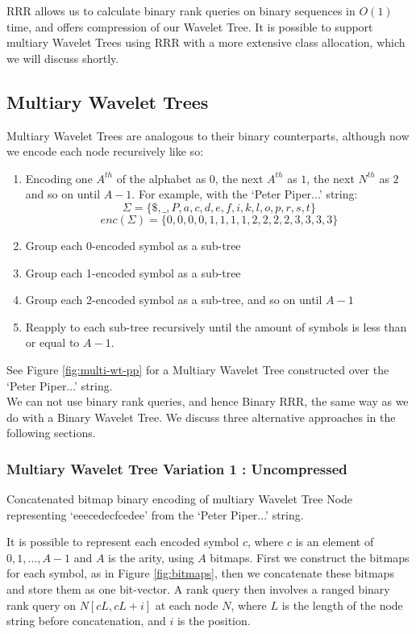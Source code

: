 RRR allows us to calculate binary rank queries on binary sequences in $O(1)$ time, and 
offers compression of our Wavelet Tree. It is possible to support multiary 
Wavelet Trees using RRR with a more extensive class allocation, which we will 
discuss shortly.

\clearpage
\subsection{Multiary Wavelet Trees}
Multiary Wavelet Trees are analogous to their binary counterparts, although now we encode each node recursively like so:

\begin{enumerate}
    \item Encoding one $A^{th}$ of the alphabet as $0$, the next $A^{th}$ as 
		$1$, the next $N^{th}$ as $2$ and so on until $A-1$. For example, with 
		the `Peter Piper...' string:
		$$\Sigma = \{ \$, \_, P, a, c, d, e, f, i, k, l, o, p, r, s, t \}$$
	   	$$enc(\Sigma) = \{  0,  0, 0, 0, 1, 1, 1, 1, 2, 2, 2, 2, 3, 3, 3, 3 \}$$
    \item Group each 0-encoded symbol as a sub-tree
    \item Group each 1-encoded symbol as a sub-tree
    \item Group each 2-encoded symbol as a sub-tree, and so on until $A-1$
    \item Reapply to each sub-tree recursively until the amount of symbols is
	less than or equal to $A - 1$.
\end{enumerate}

See Figure \ref{fig:multi-wt-pp} for a Multiary Wavelet Tree constructed over
the `Peter Piper...' string.\\

We can not use binary rank queries, and hence Binary RRR, the same way as we do 
with a Binary Wavelet Tree. We discuss three alternative approaches in the 
following sections.

\subsubsection{Multiary Wavelet Tree Variation 1 : Uncompressed}
		{Concatenated bitmap binary encoding of multiary Wavelet Tree Node
		representing `eeecedecfcedee' from the `Peter Piper...' string.}
		
It is possible to represent each encoded symbol $c$, where $c$ is an element of
${ 0, 1,..., A - 1}$ and $A$ is the arity, using $A$ bitmaps. First we construct
the bitmaps for each symbol, as in Figure \ref{fig:bitmaps}, then we concatenate 
these bitmaps and store them as one 
bit-vector. A rank query then involves a ranged binary rank query on $N[c L, c L 
+ i]$ at each node $N$, where $L$ is the length of the node string before 
concatenation, and $i$ is the position.

